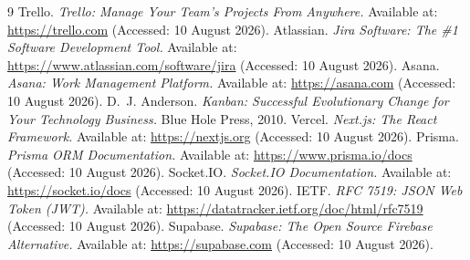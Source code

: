 \documentclass[12pt,a4paper]{report}
\begin{document}
\begin{thebibliography}{9}
 Trello. \emph{Trello: Manage Your Team's Projects From Anywhere.}
Available at: \url{https://trello.com} (Accessed: 10 August 2026).
 Atlassian. \emph{Jira Software: The \#1 Software Development Tool.}
Available at: \url{https://www.atlassian.com/software/jira} (Accessed: 10 August 2026).
 Asana. \emph{Asana: Work Management Platform.}
Available at: \url{https://asana.com} (Accessed: 10 August 2026).
 D.~J. Anderson. \emph{Kanban: Successful Evolutionary Change for
Your Technology Business.} Blue Hole Press, 2010.
 Vercel. \emph{Next.js: The React Framework.}
Available at: \url{https://nextjs.org} (Accessed: 10 August 2026).
 Prisma. \emph{Prisma ORM Documentation.}
Available at: \url{https://www.prisma.io/docs} (Accessed: 10 August 2026).
 Socket.IO. \emph{Socket.IO Documentation.}
Available at: \url{https://socket.io/docs} (Accessed: 10 August 2026).
 IETF. \emph{RFC 7519: JSON Web Token (JWT).}
Available at: \url{https://datatracker.ietf.org/doc/html/rfc7519} (Accessed: 10 August 2026).
 Supabase. \emph{Supabase: The Open Source Firebase Alternative.}
Available at: \url{https://supabase.com} (Accessed: 10 August 2026).
\end{thebibliography}
\end{document}
